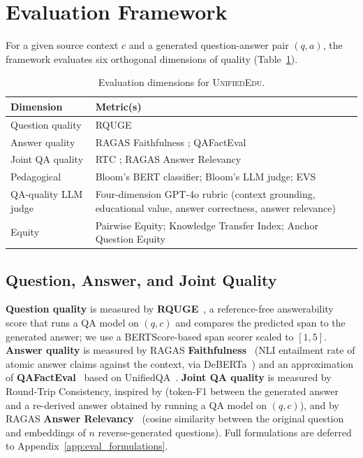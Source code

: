 \documentclass[11pt]{article}
\theoremstyle{plain}
\theoremstyle{definition}
\theoremstyle{remark}
\newcommand{\UniEdu}{\textsc{UnifiedEdu}}
\begin{document}
\section{Evaluation Framework}
\label{sec:evaluation}

For a given source context $c$ and a generated
question-answer pair $(q, a)$, the framework evaluates
six orthogonal dimensions of quality
(Table~\ref{tab:eval_overview}).

\begin{table}[t]
\centering
\small
\caption{Evaluation dimensions for \UniEdu{}.}
\label{tab:eval_overview}
\begin{tabular}{p{2.0cm}p{4.6cm}}
\toprule
\textbf{Dimension} & \textbf{Metric(s)} \\
\midrule
Question quality & RQUGE \citep{mohammadshahi2023rquge} \\
Answer quality   & RAGAS Faithfulness \citep{es2023ragas};
                   QAFactEval \citep{fabbri2022qafacteval} \\
Joint QA quality & RTC \citep{alberti2019synthetic};
                   RAGAS Answer Relevancy
                   \citep{es2023ragas} \\
Pedagogical      & Bloom's BERT classifier; Bloom's LLM
                   judge; EVS \\
QA-quality LLM judge
                 & Four-dimension GPT-4o rubric
                   (context grounding, educational
                   value, answer correctness, answer
                   relevance) \\
Equity           & Pairwise Equity; Knowledge Transfer
                   Index; Anchor Question Equity \\
\bottomrule
\end{tabular}
\end{table}

\subsection{Question, Answer, and Joint Quality}
\label{sec:qa_quality}

\textbf{Question quality} is measured by
\textbf{RQUGE}~\citep{mohammadshahi2023rquge}, a
reference-free answerability score that runs a QA
model on $(q, c)$ and compares the predicted span to
the generated answer; we use a BERTScore-based span
scorer scaled to $[1,5]$. \textbf{Answer quality} is
measured by RAGAS
\textbf{Faithfulness}~\citep{es2023ragas} (NLI
entailment rate of atomic answer claims against the
context, via DeBERTa~\citep{he2021deberta}) and an
approximation of
\textbf{QAFactEval}~\citep{fabbri2022qafacteval}
based on UnifiedQA~\citep{khashabi2022unifiedqa}.
\textbf{Joint QA quality} is measured by Round-Trip
Consistency, inspired by
\citet{alberti2019synthetic} (token-F1 between the
generated answer and a re-derived answer obtained
by running a QA model on $(q, c)$), and by RAGAS
\textbf{Answer Relevancy}~\citep{es2023ragas}
(cosine similarity between the original question and
embeddings of $n$ reverse-generated questions). Full
formulations are deferred to
Appendix~\ref{app:eval_formulations}.
\end{document}
